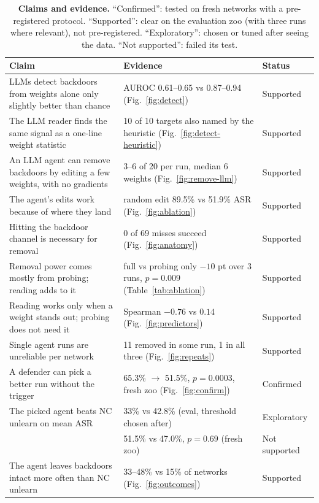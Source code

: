 \documentclass[11pt]{article}
\begin{document}
\begin{table}[!htb]
  \centering
  \caption{\textbf{Claims and evidence.} ``Confirmed'': tested on fresh networks with a pre-registered
  protocol. ``Supported'': clear on the evaluation zoo (with three runs where relevant), not
  pre-registered. ``Exploratory'': chosen or tuned after seeing the data. ``Not supported'': failed its
  test.}
  \label{tab:claims}
  \small
  \renewcommand{\arraystretch}{1.15}
  \begin{tabular}{p{6.2cm}p{5.6cm}l}
    \toprule
    Claim & Evidence & Status \\
    \midrule
    LLMs detect backdoors from weights alone only slightly better than chance & AUROC 0.61--0.65 vs
      0.87--0.94 (Fig.~\ref{fig:detect}) & Supported \\
    The LLM reader finds the same signal as a one-line weight statistic & 10 of 10 targets also named by
      the heuristic (Fig.~\ref{fig:detect-heuristic}) & Supported \\
    An LLM agent can remove backdoors by editing a few weights, with no gradients & 3--6 of 20 per run,
      median 6 weights (Fig.~\ref{fig:remove-llm}) & Supported \\
    The agent's edits work because of where they land & random edit 89.5\% vs 51.9\% ASR
      (Fig.~\ref{fig:ablation}) & Supported \\
    Hitting the backdoor channel is necessary for removal & 0 of 69 misses succeed
      (Fig.~\ref{fig:anatomy}) & Supported \\
    Removal power comes mostly from probing; reading adds to it & full vs probing only $-10$ pt over 3
      runs, $p=0.009$ (Table~\ref{tab:ablation}) & Supported \\
    Reading works only when a weight stands out; probing does not need it & Spearman $-0.76$ vs $0.14$
      (Fig.~\ref{fig:predictors}) & Supported \\
    Single agent runs are unreliable per network & 11 removed in some run, 1 in all three
      (Fig.~\ref{fig:repeats}) & Supported \\
    A defender can pick a better run without the trigger & 65.3\% $\to$ 51.5\%, $p=0.0003$, fresh zoo
      (Fig.~\ref{fig:confirm}) & Confirmed \\
    The picked agent beats NC unlearn on mean ASR & 33\% vs 42.8\% (eval, threshold chosen after) &
      Exploratory \\
     & 51.5\% vs 47.0\%, $p=0.69$ (fresh zoo) & Not supported \\
    The agent leaves backdoors intact more often than NC unlearn & 33--48\% vs 15\% of networks
      (Fig.~\ref{fig:outcomes}) & Supported \\
    \bottomrule
  \end{tabular}
\end{table}
\end{document}

